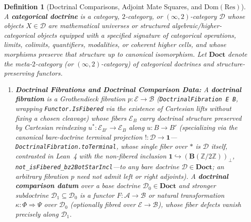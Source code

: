 \documentclass[10pt,twoside,openright]{book}
\theoremstyle{crmplain}
\theoremstyle{crmdef}
\newtheorem{definition}[theorem]{Definition}
\theoremstyle{crmremark}
\newcommand{\lean}[1]{\ignorespaces}
\newcommand{\leanwitness}{\ignorespaces}
\begin{document}
\begin{definition}[Doctrinal Comparisons, Adjoint Mate Squares, and $\mathrm{Dom}(\mathrm{Res})$]\label{def:comparison-triple}%
\lean{HomotopyCRM.DoctrinalFibration, HomotopyCRM.DoctrinalFibration.toTerminal, HomotopyCRM.not_isFibered_bz2BotStarIncl, HomotopyCRM.MateDoubleSquare, HomotopyCRM.mateDoubleSquare_mate_involutive, HomotopyCRM.nonId_mateDoubleSquare_beckChevalley_sep}%
\leanwitness%
A \textbf{categorical doctrine} is a category, $2$-category, or $(\infty, 2)$-category $\mathcal{D}$ whose objects $X \in \mathcal{D}$ are mathematical universes or structured algebraic/higher-categorical objects equipped with a specified signature of categorical operations, limits, colimits, quantifiers, modalities, or coherent higher cells, and whose morphisms preserve that structure up to canonical isomorphism. Let $\mathbf{Doct}$ denote the meta-$2$-category (or $(\infty, 2)$-category) of categorical doctrines and structure-preserving functors.
\begin{enumerate}[label=\textup{(\roman*)},leftmargin=2.0em]
  \item \textbf{Doctrinal Fibrations and Doctrinal Comparison Data:} A \textbf{doctrinal fibration} is a Grothendieck fibration $p : \mathcal{E} \to \mathcal{B}$ (\texttt{DoctrinalFibration E B}, wrapping \texttt{Functor.IsFibered} via the existence of Cartesian lifts without fixing a chosen cleavage) whose fibers $\mathcal{E}_B$ carry doctrinal structure preserved by Cartesian reindexing $u^* : \mathcal{E}_{B'} \to \mathcal{E}_B$ along $u : B \to B'$ (specializing via the canonical bare-doctrine terminal projection $! : \mathcal{D} \to \mathbf{1}$---\texttt{DoctrinalFibration.toTerminal}, whose single fiber over $*$ is $\mathcal{D}$ itself, contrasted in Lean~4 with the non-fibered inclusion $\mathbf{1} \hookrightarrow (\mathbf{B}(\mathbb{Z}/2\mathbb{Z}))_\bot$, \texttt{not\_\allowbreak isFibered\_\allowbreak bz2BotStarIncl}---to any bare doctrine $\mathcal{D} \in \mathbf{Doct}$; an arbitrary fibration $p$ need \emph{not} admit left or right adjoints). A \textbf{doctrinal comparison datum} over a base doctrine $\mathcal{D}_0 \in \mathbf{Doct}$ and stronger subdoctrine $\mathcal{D}_1 \subseteq \mathcal{D}_0$ is a functor $F : \mathcal{A} \to \mathcal{B}$ or natural transformation $\kappa : \Phi \Rightarrow \Psi$ over $\mathcal{D}_0$ (optionally fibred over $\mathcal{E} \to \mathcal{B}$), whose fiber defects vanish precisely along $\mathcal{D}_1$.

\end{enumerate}
\end{definition}
\end{document}
